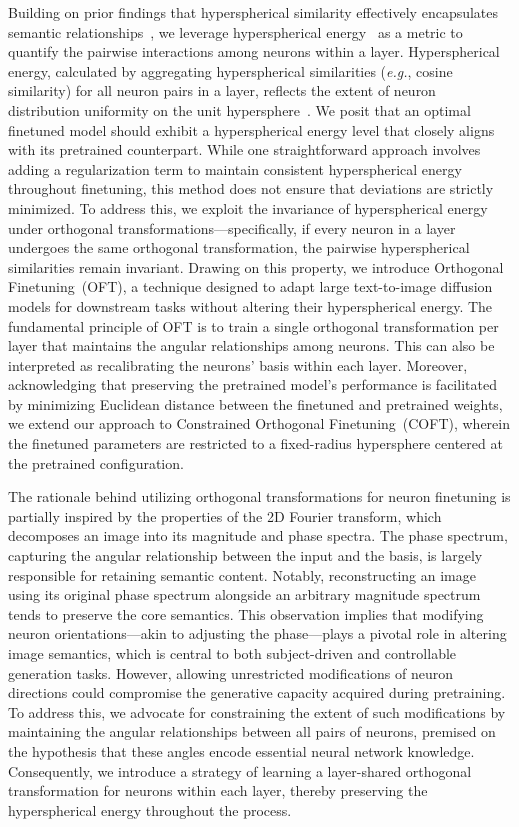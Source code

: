 Building on prior findings that hyperspherical similarity effectively encapsulates semantic relationships~\cite{liu2017deep,liu2018decoupled,chen2020angular}, we leverage hyperspherical energy~\cite{liu2018learning} as a metric to quantify the pairwise interactions among neurons within a layer. Hyperspherical energy, calculated by aggregating hyperspherical similarities (\emph{e.g.}, cosine similarity) for all neuron pairs in a layer, reflects the extent of neuron distribution uniformity on the unit hypersphere~\cite{liu2021learning}. We posit that an optimal finetuned model should exhibit a hyperspherical energy level that closely aligns with its pretrained counterpart. While one straightforward approach involves adding a regularization term to maintain consistent hyperspherical energy throughout finetuning, this method does not ensure that deviations are strictly minimized. To address this, we exploit the invariance of hyperspherical energy under orthogonal transformations—specifically, if every neuron in a layer undergoes the same orthogonal transformation, the pairwise hyperspherical similarities remain invariant. Drawing on this property, we introduce Orthogonal Finetuning~(OFT), a technique designed to adapt large text-to-image diffusion models for downstream tasks without altering their hyperspherical energy. The fundamental principle of OFT is to train a single orthogonal transformation per layer that maintains the angular relationships among neurons. This can also be interpreted as recalibrating the neurons’ basis within each layer. Moreover, acknowledging that preserving the pretrained model’s performance is facilitated by minimizing Euclidean distance between the finetuned and pretrained weights, we extend our approach to Constrained Orthogonal Finetuning~(COFT), wherein the finetuned parameters are restricted to a fixed-radius hypersphere centered at the pretrained configuration.

The rationale behind utilizing orthogonal transformations for neuron finetuning is partially inspired by the properties of the 2D Fourier transform, which decomposes an image into its magnitude and phase spectra. The phase spectrum, capturing the angular relationship between the input and the basis, is largely responsible for retaining semantic content. Notably, reconstructing an image using its original phase spectrum alongside an arbitrary magnitude spectrum tends to preserve the core semantics. This observation implies that modifying neuron orientations—akin to adjusting the phase—plays a pivotal role in altering image semantics, which is central to both subject-driven and controllable generation tasks. However, allowing unrestricted modifications of neuron directions could compromise the generative capacity acquired during pretraining. To address this, we advocate for constraining the extent of such modifications by maintaining the angular relationships between all pairs of neurons, premised on the hypothesis that these angles encode essential neural network knowledge. Consequently, we introduce a strategy of learning a layer-shared orthogonal transformation for neurons within each layer, thereby preserving the hyperspherical energy throughout the process.

